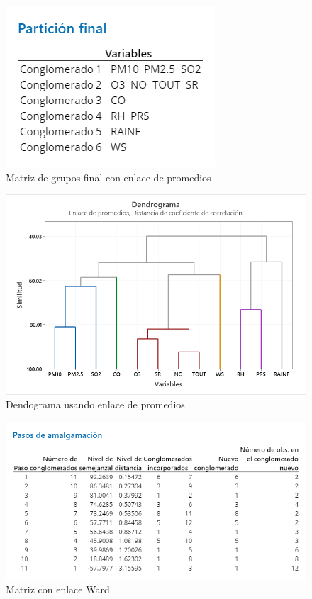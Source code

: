 \documentclass[journal, 10pt]{IEEEtran}                                                          %
\begin{document}
\begin{figure}[H]
    \centering
    \includegraphics[scale=.3]{matrizAvgFinal.png}
    \caption{Matriz de grupos final con enlace de promedios}
    \label{fig:matrizAvgFinal}
\end{figure}

\begin{figure}[H]
    \centering
    \includegraphics[scale=.3]{dendogramaAvg.png}
    \caption{Dendograma usando enlace de promedios}
    \label{fig:dendogramaAvg}
\end{figure}



\begin{figure}[H]
    \centering
    \includegraphics[scale=.3]{matrizWard.png}
    \caption{Matriz con enlace Ward}
    \label{fig:matrizWard}
\end{figure}
\end{document}
